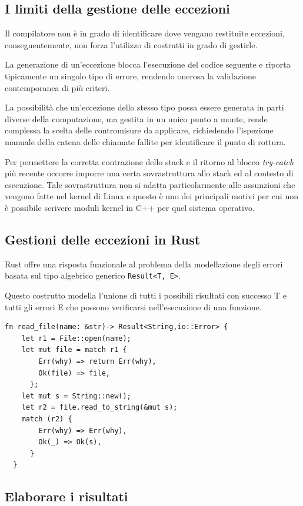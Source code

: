 \subsection{I limiti della gestione delle eccezioni}
Il compilatore non è in grado di identificare dove vengano restituite eccezioni,
conseguentemente, non forza l'utilizzo di costrutti in grado di gestirle.

La generazione di un'eccezione blocca l'esecuzione del codice seguente e riporta
tipicamente un singolo tipo di errore, rendendo onerosa la validazione
contemporanea di più criteri.


La possibilità che un'eccezione dello stesso tipo possa essere generata in parti
diverse della computazione, ma gestita in un unico punto a monte, rende
complessa la scelta delle contromisure da applicare, richiedendo l'ispezione
manuale della catena delle chiamate fallite per identificare il punto di
rottura.

Per permettere la corretta contrazione dello stack e il ritorno al
blocco \textit{try-catch} più recente occorre imporre una certa sovrastruttura allo
stack ed al contesto di esecuzione. Tale sovrastruttura non si adatta
particolarmente alle assunzioni che vengono fatte nel kernel di Linux e questo è
uno dei principali motivi per cui non è possibile scrivere moduli kernel in C++
per quel sistema operativo.


\subsection{Gestioni delle eccezioni in Rust}
Rust offre una risposta funzionale al problema della modellazione degli errori
basata sul tipo algebrico generico \texttt{Result<T, E>}.

Questo costrutto modella l'unione di tutti i possibili risultati con successo T
e tutti gli errori E che possono verificarsi nell'esecuzione di una funzione.


\begin{verbatim}
fn read_file(name: &str)-> Result<String,io::Error> {
    let r1 = File::open(name);
    let mut file = match r1 {
        Err(why) => return Err(why),
        Ok(file) => file,
      };
    let mut s = String::new();
    let r2 = file.read_to_string(&mut s);
    match (r2) {
        Err(why) => Err(why),
        Ok(_) => Ok(s),
      }
  }
\end{verbatim}

\subsection{Elaborare i risultati}


